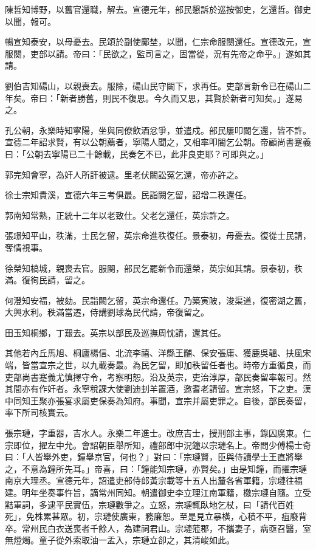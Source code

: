 \begin{pinyinscope}
陳哲知博野，以舊官還職，解去。宣德元年，部民懇訴於巡按御史，乞還哲。御史以聞，報可。

暢宣知泰安，以母憂去。民頌於副使鄺埜，以聞，仁宗命服闋還任。宣德改元，宣服闋，吏部以請。帝曰：「民欲之，監司言之，固當從，況有先帝之命乎。」遂如其請。

劉伯吉知碭山，以親喪去。服除，碭山民守闕下，求再任。吏部言新令已在碭山二年矣。帝曰：「新者勝舊，則民不復思。今久而又思，其賢於新者可知矣。」遂易之。

孔公朝，永樂時知寧陽，坐與同僚飲酒忿爭，並遣戍。部民屢叩閽乞還，皆不許。宣德二年詔求賢，有以公朝薦者，寧陽人聞之，又相率叩閽乞公朝。帝顧尚書蹇義曰：「公朝去寧陽已二十餘載，民奏乞不已，此非良吏耶？可即與之。」

郭完知會寧，為奸人所訐被逮。里老伏闕訟冤乞還，帝亦許之。

徐士宗知貴溪，宣德六年三考俱最。民詣闕乞留，詔增二秩還任。

郭南知常熟，正統十二年以老致仕。父老乞還任，英宗許之。

張璟知平山，秩滿，士民乞留，英宗命進秩復任。景泰初，母憂去。復從士民請，奪情視事。

徐榮知槁城，親喪去官。服闋，部民乞罷新令而還榮，英宗如其請。景泰初，秩滿。復徇民請，留之。

何澄知安福，被劾。民詣闕乞留，英宗命還任。乃築寅陂，浚渠道，復密湖之舊，大興水利。秩滿當遷，侍講劉球為民代請，帝復留之。

田玉知桐鄉，丁艱去。英宗以部民及巡撫周忱請，還其任。

其他若內丘馬旭、桐廬楊信、北流李禧、洋縣王黼、保安張庸、獲鹿吳韞、扶風宋端，皆當宣宗之世，以九載奏最。為民乞留，即加秩留任者也。時帝方重循良，而吏部尚書蹇義尤慎擇守令，考察明恕。沿及英宗，吏治淳厚，部民奏留率報可。然其間亦有作奸者。永寧稅課大使劉迪刲羊置酒，邀耆老請留。宣宗怒，下之吏。漢中同知王聚亦張宴求屬吏保奏為知府。事聞，宣宗并屬吏罪之。自後，部民奏留，率下所司核實云。

張宗璉，字重器，吉水人。永樂二年進士。改庶吉士，授刑部主事，錄囚廣東。仁宗即位，擢左中允。會詔朝臣舉所知，禮部郎中況鐘以宗璉名上。帝問少傅楊士奇曰：「人皆舉外吏，鐘舉京官，何也？」對曰：「宗璉賢，臣與侍讀學士王直將舉之，不意為鐘所先耳。」帝喜，曰：「鐘能知宗璉，亦賢矣。」由是知鐘，而擢宗璉南京大理丞。宣德元年，詔遣吏部侍郎黃宗載等十五人出釐各省軍籍，宗璉往福建。明年坐奏事忤旨，謫常州同知。朝遣御史李立理江南軍籍，檄宗璉自隨。立受黠軍詞，多逮平民實伍，宗璉數爭之。立怒，宗璉輒臥地乞杖，曰「請代百姓死」，免株累甚眾。初，宗璉使廣東，務廉恕。至是見立暴橫，心積不平，疽廢背卒。常州民白衣送喪者千餘人，為建祠君山。宗璉蒞郡，不攜妻子，病亟召醫，室無燈燭。童子從外索取油一盂入，宗璉立卻之，其清峻如此。


\end{pinyinscope}
